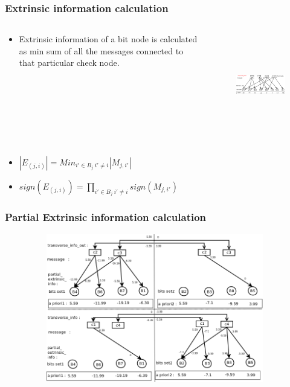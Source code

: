 \documentclass[xcolor=dvipsname]
{beamer}
\begin{document}
\begin{frame}[t]
\frametitle{ Extrinsic information calculation }  
\vspace{-5mm}
\begin{columns}[totalwidth=\textwidth]
	\begin{column}{0.3\textwidth}
	\centering
	\begin{itemize}
	\item Extrinsic information of a bit node is calculated as min sum of all the messages connected to 
	that particular check node. 	
	\end{itemize}
 
			
	\end{column}%
	   		
	\begin{column}{0.7\textwidth}
	\centering
	\begin{figure}
	\includegraphics[height=4.5cm,width=8cm]{minSum4}
	\end{figure}
	\end{column}%
\end{columns}

\begin{itemize}

\item \alert{$|E_{(j,i)}| =  Min_{i'\in B_j \ i'\neq i }|M_{j,i'}|   $ }
\item \alert{$sign({E_{(j,i)}}) =  \prod_{i'\in B_j \ i'\neq i }sign(M_{j,i'})   $ }
\end{itemize}
\end{frame}

\begin{frame}[t]
\frametitle{ Partial Extrinsic information calculation }  
\vspace{-5mm}
\begin{figure}
       \includegraphics[height=6.5cm,width=11cm]{minSumModified3}
       \end{figure}
\end{frame}
\end{document}

